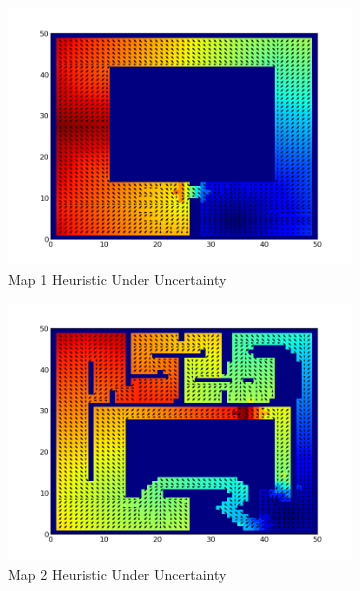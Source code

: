 \documentclass{article}
\begin{document}
\begin{figure}[ht]
    \centering
    \begin{subfigure}[b]{0.45\textwidth}
        \includegraphics[width = \textwidth]{map1value_uncertain.png}
        \caption{Map 1 Heuristic Under Uncertainty}
        \label{fig:map1value_mod}
    \end{subfigure}
    \begin{subfigure}[b]{0.45\textwidth}
        \includegraphics[width = \textwidth]{map2value_uncertain.png}
        \caption{Map 2 Heuristic Under Uncertainty}
        \label{fig:map2value_mod}
    \end{subfigure}
    \begin{subfigure}[b]{0.45\textwidth}

\end{subfigure}
\end{figure}
\end{document}
